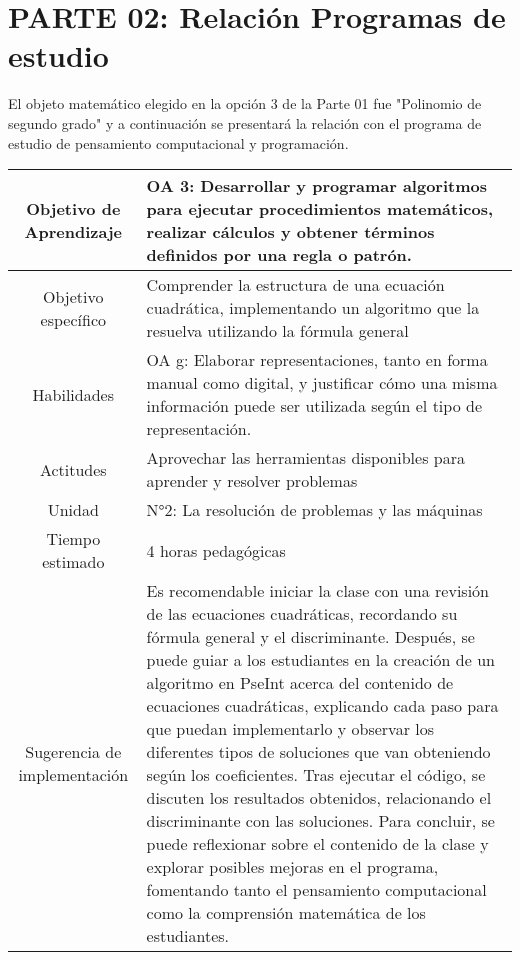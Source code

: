 \documentclass{article}
\begin{document}
\section*{PARTE 02: Relación Programas de estudio} 
El objeto matemático elegido en la opción 3 de la Parte 01 fue "Polinomio de segundo grado" y a continuación se presentará la relación con el programa de estudio de pensamiento computacional y programación.
\begin{table}[h!]
    \centering
   \begin{tabularx}{\textwidth}{|c|X|}
        \hline
        Objetivo de Aprendizaje & OA 3: Desarrollar y programar algoritmos para ejecutar procedimientos matemáticos, realizar cálculos y obtener términos definidos por una regla o patrón.\\
        \hline
        Objetivo específico & Comprender la estructura de una ecuación cuadrática, implementando un algoritmo que la resuelva utilizando la fórmula general\\
        \hline
        Habilidades & OA g: Elaborar representaciones, tanto en forma manual como digital, y justificar cómo una misma información puede ser utilizada según el tipo de representación.\\
        \hline
        Actitudes & Aprovechar las herramientas disponibles para aprender y resolver problemas\\
        \hline
        Unidad & N°2: La resolución de problemas y las máquinas\\
        \hline
        Tiempo estimado & 4 horas pedagógicas\\
        \hline
        Sugerencia de implementación & Es recomendable iniciar la clase con una revisión de las ecuaciones cuadráticas, recordando su fórmula general y el discriminante. Después, se puede guiar a los estudiantes en la creación de un algoritmo en PseInt acerca del contenido de ecuaciones cuadráticas, explicando cada paso para que puedan implementarlo y observar los diferentes tipos de soluciones que van obteniendo según los coeficientes. Tras ejecutar el código, se discuten los resultados obtenidos, relacionando el discriminante con las soluciones. Para concluir, se puede reflexionar sobre el contenido de la clase y explorar posibles mejoras en el programa, fomentando tanto el pensamiento computacional como la comprensión matemática de los estudiantes.\\
        \hline
\end{tabularx}
\end{table}
\end{document}
